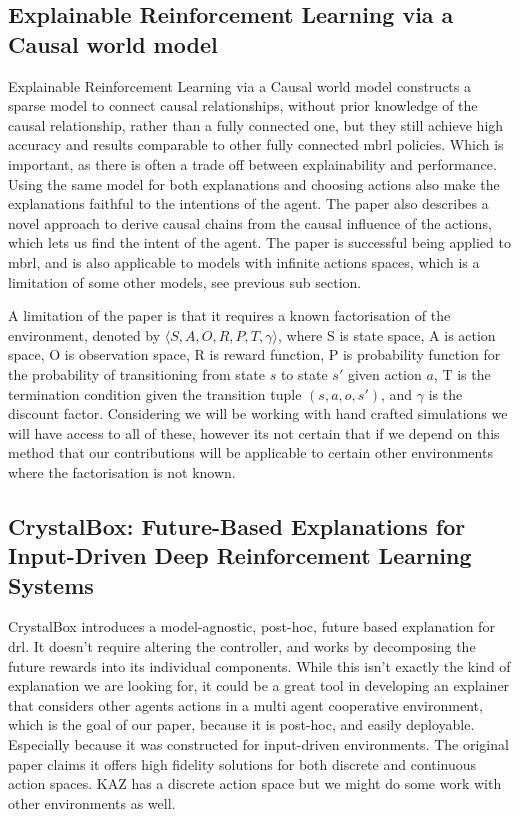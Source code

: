 \documentclass[UKenglish]{uiomasterthesis}
\begin{document}
\subsection{Explainable Reinforcement Learning via a Causal world model}
Explainable Reinforcement Learning via a Causal world model constructs a sparse model to connect causal relationships, without prior knowledge of the causal relationship, rather than a fully connected one, but they still achieve high accuracy and results comparable to other fully connected \ac{mbrl} policies. Which is important, as there is often a trade off between explainability and performance. Using the same model for both explanations and choosing actions also make the explanations faithful to the intentions of the agent. The paper also describes a novel approach to derive causal chains from the causal influence of the actions, which lets us find the intent of the agent. The paper is successful being applied to \ac{mbrl}, and is also applicable to models with infinite actions spaces, which is a limitation of some other models, see previous sub section.

A limitation of the paper is that it requires a known factorisation of the environment, denoted by $\langle S, A, O, R, P, T, \gamma \rangle$, where S is state space, A is action space, O is observation space, R is reward function, P is probability function for the probability of transitioning from state $s$ to state $s'$ given action $a$, T is the termination condition given the transition tuple $(s,a,o,s')$, and $\gamma$ is the discount factor. Considering we will be working with hand crafted simulations we will have access to all of these, however its not certain that if we depend on this method that our contributions will be applicable to certain other environments where the factorisation is not known.


\subsection{CrystalBox: Future-Based Explanations for Input-Driven Deep Reinforcement Learning Systems}
CrystalBox introduces a model-agnostic, post-hoc, future based explanation for \ac{drl}. It doesn't require altering the controller, and works by decomposing the future rewards into its individual components. While this isn't exactly the kind of explanation we are looking for, it could be a great tool in developing an explainer that considers other agents actions in a multi agent cooperative environment, which is the goal of our paper, because it is post-hoc, and easily deployable. Especially because it was constructed for input-driven environments. The original paper claims it offers high fidelity solutions for both discrete and continuous action spaces. KAZ has a discrete action space but we might do some work with other environments as well.
\end{document}
